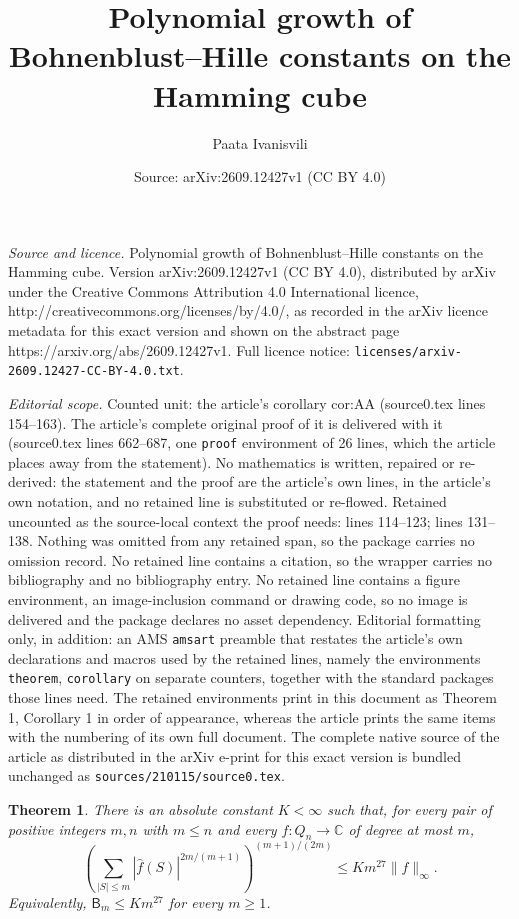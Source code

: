 \documentclass[10pt,a4paper]{amsart}
\title{Polynomial growth of Bohnenblust--Hille constants on the Hamming cube}
\author{Paata Ivanisvili}
\date{Source: arXiv:2609.12427v1 (CC BY 4.0)}
\newtheorem{theorem}{Theorem}
\newcommand{\BH}{\mathsf B}
\begin{document}
\maketitle

\noindent\emph{Source and licence.} Polynomial growth of Bohnenblust--Hille constants on the Hamming cube. Version arXiv:2609.12427v1 (CC BY 4.0), distributed by arXiv under the Creative Commons Attribution 4.0 International licence, http://creativecommons.org/licenses/by/4.0/, as recorded in the arXiv licence metadata for this exact version and shown on the abstract page https://arxiv.org/abs/2609.12427v1. Full licence notice: \texttt{licenses/arxiv-2609.12427-CC-BY-4.0.txt}.\par\smallskip

\noindent\textit{Editorial scope.} Counted unit: the article's corollary cor:AA (source0.tex lines 154--163). The article's complete original proof of it is delivered with it (source0.tex lines 662--687, one \texttt{proof} environment of 26 lines, which the article places away from the statement). No mathematics is written, repaired or re-derived: the statement and the proof are the article's own lines, in the article's own notation, and no retained line is substituted or re-flowed.  Retained uncounted as the source-local context the proof needs: lines 114--123; lines 131--138.  Nothing was omitted from any retained span, so the package carries no omission record.  No retained line contains a citation, so the wrapper carries no bibliography and no bibliography entry.  No retained line contains a figure environment, an image-inclusion command or drawing code, so no image is delivered and the package declares no asset dependency.  Editorial formatting only, in addition: an AMS \texttt{amsart} preamble that restates the article's own declarations and macros used by the retained lines, namely the environments \texttt{theorem}, \texttt{corollary} on separate counters, together with the standard packages those lines need.  The retained environments print in this document as Theorem 1, Corollary 1 in order of appearance, whereas the article prints the same items with the numbering of its own full document.  The complete native source of the article as distributed in the arXiv e-print for this exact version is bundled unchanged as \texttt{sources/210115/source0.tex}.
\begin{theorem}\label{thm:main}
There is an absolute constant $K<\infty$ such that, for every pair of
positive integers $m,n$ with $m\le n$ and every $f:Q_n\to\mathbb C$ of degree
at most $m$,
\begin{equation}\label{eq:main}
\left(\sum_{|S|\le m}|\widehat f(S)|^{2m/(m+1)}\right)^{(m+1)/(2m)}
\le Km^{27}\|f\|_\infty.
\end{equation}
Equivalently, $\BH_m\le Km^{27}$ for every $m\ge1$.
\end{theorem}
\end{document}
